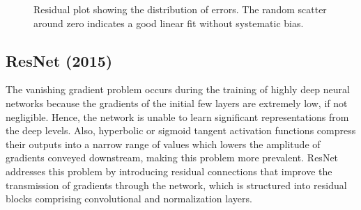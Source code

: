\documentclass[12pt,a4paper,twoside]{article}
\theoremstyle{definition}
\begin{document}
\begin{figure}[H]
\centering
{}
\caption{Residual plot showing the distribution of errors. The random scatter around zero indicates a good linear fit without systematic bias.}
\label{fig:residual_plot}
\end{figure}

\subsection{ResNet (2015)}
\label{sec:resnet}
The vanishing gradient problem occurs during the training of highly deep neural networks because the gradients of the initial few layers  are extremely low, if not negligible. Hence, the network is unable to learn significant representations from the deep levels. Also, hyperbolic or sigmoid tangent activation functions compress their outputs into a narrow range of values which lowers the amplitude of gradients conveyed downstream, making this problem more prevalent. ResNet \cite{resnet} addresses this problem by introducing residual connections that improve the transmission of gradients through the network, which is structured into residual blocks comprising convolutional and normalization layers.
\end{document}
